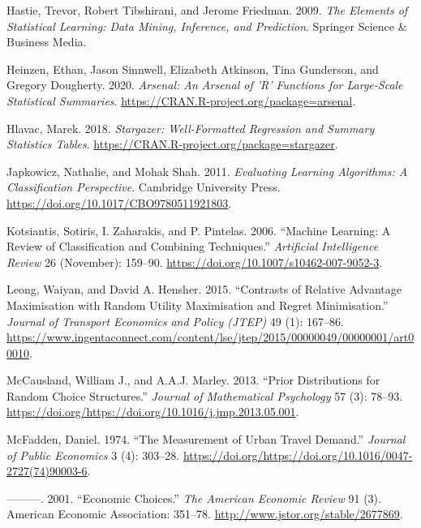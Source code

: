 \documentclass[12pt,]{article}
\begin{document}
\leavevmode\hypertarget{ref-hastie2009sl}{}%
Hastie, Trevor, Robert Tibshirani, and Jerome Friedman. 2009. \emph{The
Elements of Statistical Learning: Data Mining, Inference, and
Prediction}. Springer Science \& Business Media.

\leavevmode\hypertarget{ref-R-arsenal}{}%
Heinzen, Ethan, Jason Sinnwell, Elizabeth Atkinson, Tina Gunderson, and
Gregory Dougherty. 2020. \emph{Arsenal: An Arsenal of 'R' Functions for
Large-Scale Statistical Summaries}.
\url{https://CRAN.R-project.org/package=arsenal}.

\leavevmode\hypertarget{ref-R-stargazer}{}%
Hlavac, Marek. 2018. \emph{Stargazer: Well-Formatted Regression and
Summary Statistics Tables}.
\url{https://CRAN.R-project.org/package=stargazer}.

\leavevmode\hypertarget{ref-japkowicz2011el}{}%
Japkowicz, Nathalie, and Mohak Shah. 2011. \emph{Evaluating Learning
Algorithms: A Classification Perspective}. Cambridge University Press.
\url{https://doi.org/10.1017/CBO9780511921803}.

\leavevmode\hypertarget{ref-kotsiantis2006tr}{}%
Kotsiantis, Sotiris, I. Zaharakis, and P. Pintelas. 2006. ``Machine
Learning: A Review of Classification and Combining Techniques.''
\emph{Artificial Intelligence Review} 26 (November): 159--90.
\url{https://doi.org/10.1007/s10462-007-9052-3}.

\leavevmode\hypertarget{ref-leong2015ram}{}%
Leong, Waiyan, and David A. Hensher. 2015. ``Contrasts of Relative
Advantage Maximisation with Random Utility Maximisation and Regret
Minimisation.'' \emph{Journal of Transport Economics and Policy (JTEP)}
49 (1): 167--86.
\url{https://www.ingentaconnect.com/content/lse/jtep/2015/00000049/00000001/art00010}.

\leavevmode\hypertarget{ref-mccausland2013pd}{}%
McCausland, William J., and A.A.J. Marley. 2013. ``Prior Distributions
for Random Choice Structures.'' \emph{Journal of Mathematical
Psychology} 57 (3): 78--93.
\url{https://doi.org/https://doi.org/10.1016/j.jmp.2013.05.001}.

\leavevmode\hypertarget{ref-mcfadden1974utd}{}%
McFadden, Daniel. 1974. ``The Measurement of Urban Travel Demand.''
\emph{Journal of Public Economics} 3 (4): 303--28.
\url{https://doi.org/https://doi.org/10.1016/0047-2727(74)90003-6}.

\leavevmode\hypertarget{ref-mcfadden2001ec}{}%
---------. 2001. ``Economic Choices.'' \emph{The American Economic
Review} 91 (3). American Economic Association: 351--78.
\url{http://www.jstor.org/stable/2677869}.
\end{document}
